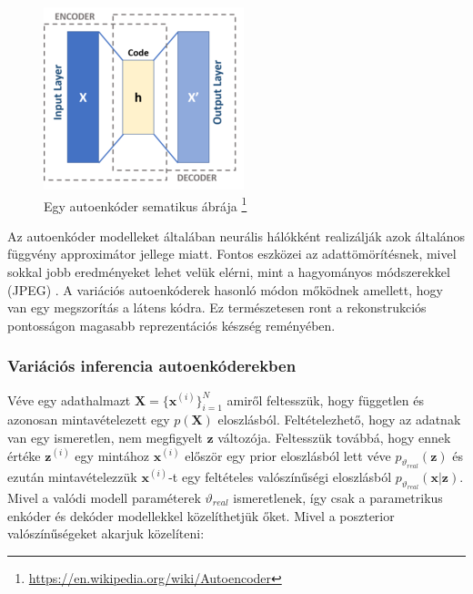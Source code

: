\documentclass[12pt, english]{article}
\begin{document}
\vspace{4mm}

\begin{figure}[H]
    \centering
    \includegraphics[width=0.3\linewidth]{220px-Autoencoder_schema.png}
    \caption{Egy autoenkóder sematikus ábrája \footnote{\url{https://en.wikipedia.org/wiki/Autoencoder}}}
    \label{fig:auto_encoder_scheme}
\end{figure}

\vspace{4mm}

\par Az autoenkóder modelleket általában neurális hálókként realizálják azok általános függvény approximátor jellege miatt. Fontos eszközei az adattömörítésnek, mivel sokkal jobb eredményeket lehet velük elérni, mint a hagyományos módszerekkel (JPEG) \cite{theis2017lossy}. A variációs autoenkóderek hasonló módon mőködnek amellett, hogy van egy megszorítás a látens kódra. Ez természetesen ront a rekonstrukciós pontosságon magasabb reprezentációs készség reményében.

\vspace{4mm}

\subsubsection{Variációs inferencia autoenkóderekben}

\vspace{4mm}

\par Véve egy adathalmazt $\boldsymbol{X} = \big\{\boldsymbol{\bm{x}}^{(i)}\big\}_{i = 1}^{N}$ amiről feltesszük, hogy független és azonosan mintavételezett egy $p(\boldsymbol{X})$ eloszlásból. Feltételezhető, hogy az adatnak van egy ismeretlen, nem megfigyelt $\boldsymbol{\bm{z}}$ változója. Feltesszük továbbá, hogy ennek értéke $\boldsymbol{\bm{z}}^{(i)}$ egy mintához $\boldsymbol{\bm{x}}^{(i)}$ először egy prior eloszlásból lett véve $p_{\vartheta_{real}}(\boldsymbol{\bm{z}})$ és ezután mintavételezzük $\bm{x}^{(i)}$-t egy feltételes valószínűségi eloszlásból  $p_{\vartheta_{real}}(\boldsymbol{\bm{x}} | \boldsymbol{\bm{z}})$. Mivel a valódi modell paraméterek $\vartheta_{real}$ ismeretlenek, így csak a parametrikus enkóder és dekóder modellekkel közelíthetjük őket. Mivel a poszterior valószínűségeket akarjuk közelíteni:
\end{document}
